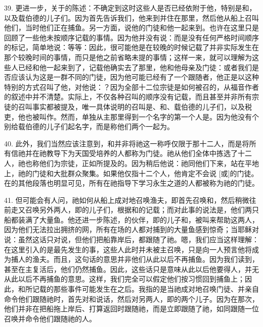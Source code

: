 39. 更进一步，关于的陈述：不确定到这时这些人是否已经依附于他，特别是和，以及载伯德的儿子们。因为首先告诉我们，他来到并住在那里，然后他从船上召叫他们，当时他们正在捕鱼。另一方面，说他的门徒和他一起来到。也许在这里只是回顾了一些他未按顺序记载的事情。因为他并没有说：而是没有任何严格时间顺序的标记，简单地说：等等：因此，很可能他是在较晚的时候记载了并非实际发生在那个较晚时间的事情，而只是他之前省略未提的事情；这样一来，就可以理解为这些人已经和他一起来到了，记载他确实去了那里，他和他母亲及门徒：或者我们是否应该认为这是一群不同的门徒，因为他可能已经有了一个跟随者，他正是以这种特别的方式召叫了他，对他说：？因为全部十二位宗徒是如何被召的，从福音作者的叙述中并不清楚。实际上，不仅各种召叫的顺序没有记载，而且甚至并非所有宗徒的召叫事实都被提及，唯一具体说明的召叫是、和、载伯德的儿子们，以及税吏，他也被叫作。然而，单独从主那里得到一个名字的第一个人是。因为他没有个别给载伯德的儿子们起名字，而是称他们两个一起为。\par

40. 此外，我们当然应该注意到，和并非将祂这一称呼仅限于那十二人，而是将所有信祂并在祂教导下为天国受培养的人都称为门徒。祂从他们全体中拣选了十二人，祂也称他们为宗徒，正如所提及的。因为稍后他说：祂同他们下来，站在平地上，祂的门徒和大批群众聚集。如果他仅指十二个人，他肯定不会说 [或]的门徒。在的其他段落也明显可见，所有在祂指导下学习永生之道的人都被称为祂的门徒。\par

41. 但可能会有人问，祂如何从船上成对地召唤渔夫，即首先召唤和，然后稍微往前走又召唤另外两人，即的儿子们，根据和的记载；而对此事的说法是，他们两只船都装满了大量鱼。他还进一步陈述，的伙伴，即的儿子和，被叫来帮助这两人，因为他们无法拉出拥挤的网，所有在场的人都对捕到的大量鱼感到惊奇；当耶稣对说：虽然这话只对说，但他们把船靠岸后，都跟随了祂。嗯，我们应当这样理解：在这里引入的是最先发生的事，这些人此时并未被主召唤，只是向一人预言他将成为捕人的渔夫。而且，这句话的意思并非他们从此以后不再捕鱼。因为我们读到，甚至在主复活后，他们仍然捕鱼。因此，这些话只是意味从此以后他要得人，并无从此以后不再捕鱼的意思。这样，我们完全可以假定他们按习惯回到捕鱼上；因此，和所记载的那些事件可能发生在之后。我指的是当祂成对地召唤门徒、并亲自命令他们跟随祂时，首先对和说话，然后对另两人，即的两个儿子。因为在那次，他们并非在把船拖上岸后、打算返回时跟随祂，而是立即跟随了祂，如同跟随一位召唤并命令他们跟随祂的人。\par

